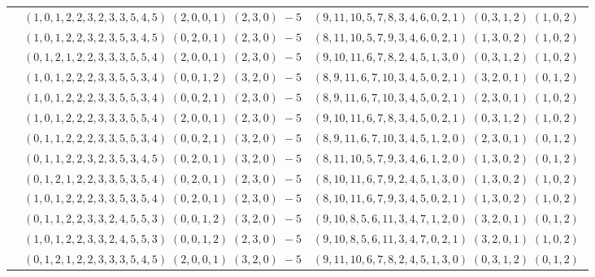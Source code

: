 \documentclass[11pt]{article}
\begin{document}
\begin{longtable}[l]{|c|c|c|}
 \cline{2-3} 
 & $(1 ,0 ,1 ,2 ,2 ,3 ,2 ,3 ,3 ,5 ,4 ,5) \;(2 ,0 ,0 ,1) \;(2 ,3 ,0) \;-5$ & $(9 ,11 ,10 ,5 ,7 ,8 ,3 ,4 ,6 ,0 ,2 ,1) \;(0 ,3 ,1 ,2) \;(1 ,0 ,2) \;$\\ 
 \cline{2-3} 
 & $(1 ,0 ,1 ,2 ,2 ,3 ,2 ,3 ,5 ,3 ,4 ,5) \;(0 ,2 ,0 ,1) \;(2 ,3 ,0) \;-5$ & $(8 ,11 ,10 ,5 ,7 ,9 ,3 ,4 ,6 ,0 ,2 ,1) \;(1 ,3 ,0 ,2) \;(1 ,0 ,2) \;$\\ 
 \cline{2-3} 
 & $(0 ,1 ,2 ,1 ,2 ,2 ,3 ,3 ,3 ,5 ,5 ,4) \;(2 ,0 ,0 ,1) \;(2 ,3 ,0) \;-5$ & $(9 ,10 ,11 ,6 ,7 ,8 ,2 ,4 ,5 ,1 ,3 ,0) \;(0 ,3 ,1 ,2) \;(1 ,0 ,2) \;$\\ 
 \cline{2-3} 
 & $(1 ,0 ,1 ,2 ,2 ,2 ,3 ,3 ,5 ,5 ,3 ,4) \;(0 ,0 ,1 ,2) \;(3 ,2 ,0) \;-5$ & $(8 ,9 ,11 ,6 ,7 ,10 ,3 ,4 ,5 ,0 ,2 ,1) \;(3 ,2 ,0 ,1) \;(0 ,1 ,2) \;$\\ 
 \cline{2-3} 
 & $(1 ,0 ,1 ,2 ,2 ,2 ,3 ,3 ,5 ,5 ,3 ,4) \;(0 ,0 ,2 ,1) \;(2 ,3 ,0) \;-5$ & $(8 ,9 ,11 ,6 ,7 ,10 ,3 ,4 ,5 ,0 ,2 ,1) \;(2 ,3 ,0 ,1) \;(1 ,0 ,2) \;$\\ 
 \cline{2-3} 
 & $(1 ,0 ,1 ,2 ,2 ,2 ,3 ,3 ,3 ,5 ,5 ,4) \;(2 ,0 ,0 ,1) \;(2 ,3 ,0) \;-5$ & $(9 ,10 ,11 ,6 ,7 ,8 ,3 ,4 ,5 ,0 ,2 ,1) \;(0 ,3 ,1 ,2) \;(1 ,0 ,2) \;$\\ 
 \cline{2-3} 
 & $(0 ,1 ,1 ,2 ,2 ,2 ,3 ,3 ,5 ,5 ,3 ,4) \;(0 ,0 ,2 ,1) \;(3 ,2 ,0) \;-5$ & $(8 ,9 ,11 ,6 ,7 ,10 ,3 ,4 ,5 ,1 ,2 ,0) \;(2 ,3 ,0 ,1) \;(0 ,1 ,2) \;$\\ 
 \cline{2-3} 
 & $(0 ,1 ,1 ,2 ,2 ,3 ,2 ,3 ,5 ,3 ,4 ,5) \;(0 ,2 ,0 ,1) \;(3 ,2 ,0) \;-5$ & $(8 ,11 ,10 ,5 ,7 ,9 ,3 ,4 ,6 ,1 ,2 ,0) \;(1 ,3 ,0 ,2) \;(0 ,1 ,2) \;$\\ 
 \cline{2-3} 
 & $(0 ,1 ,2 ,1 ,2 ,2 ,3 ,3 ,5 ,3 ,5 ,4) \;(0 ,2 ,0 ,1) \;(2 ,3 ,0) \;-5$ & $(8 ,10 ,11 ,6 ,7 ,9 ,2 ,4 ,5 ,1 ,3 ,0) \;(1 ,3 ,0 ,2) \;(1 ,0 ,2) \;$\\ 
 \cline{2-3} 
 & $(1 ,0 ,1 ,2 ,2 ,2 ,3 ,3 ,5 ,3 ,5 ,4) \;(0 ,2 ,0 ,1) \;(2 ,3 ,0) \;-5$ & $(8 ,10 ,11 ,6 ,7 ,9 ,3 ,4 ,5 ,0 ,2 ,1) \;(1 ,3 ,0 ,2) \;(1 ,0 ,2) \;$\\ 
 \cline{2-3} 
 & $(0 ,1 ,1 ,2 ,2 ,3 ,3 ,2 ,4 ,5 ,5 ,3) \;(0 ,0 ,1 ,2) \;(3 ,2 ,0) \;-5$ & $(9 ,10 ,8 ,5 ,6 ,11 ,3 ,4 ,7 ,1 ,2 ,0) \;(3 ,2 ,0 ,1) \;(0 ,1 ,2) \;$\\ 
 \cline{2-3} 
 & $(1 ,0 ,1 ,2 ,2 ,3 ,3 ,2 ,4 ,5 ,5 ,3) \;(0 ,0 ,1 ,2) \;(2 ,3 ,0) \;-5$ & $(9 ,10 ,8 ,5 ,6 ,11 ,3 ,4 ,7 ,0 ,2 ,1) \;(3 ,2 ,0 ,1) \;(1 ,0 ,2) \;$\\ 
 \cline{2-3} 
 & $(0 ,1 ,2 ,1 ,2 ,2 ,3 ,3 ,3 ,5 ,4 ,5) \;(2 ,0 ,0 ,1) \;(3 ,2 ,0) \;-5$ & $(9 ,11 ,10 ,6 ,7 ,8 ,2 ,4 ,5 ,1 ,3 ,0) \;(0 ,3 ,1 ,2) \;(0 ,1 ,2) \;$\\ 

\end{longtable}
\end{document}
